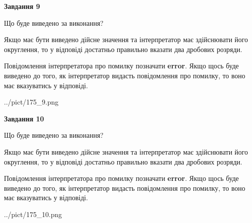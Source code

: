 \documentclass[12pt, ukrainian]{article}
\begin{document}
{\begin {Large}
{\begin {center}\textbf{Завдання 9}\end {center}}\par
Що буде виведено за виконання? \par

Якщо має бути виведено дійсне значення та інтерпретатор має здійснювати його округлення, 
то у відповіді достатньо правильно вказати два дробових розряди.

Повідомлення інтерпретатора про помилку позначати \textbf{error}.
Якщо щось буде виведено до того, як інтерпретатор видасть повідомлення про помилку, 
то воно має вказуватись у відповіді. \par

\begin{center}
	{../pict/175_9.png}
\end{center}
\newpage

{\begin {center}\textbf{Завдання 10}\end {center}}\par
Що буде виведено за виконання? \par

Якщо має бути виведено дійсне значення та інтерпретатор має здійснювати його округлення, 
то у відповіді достатньо правильно вказати два дробових розряди.

Повідомлення інтерпретатора про помилку позначати \textbf{error}.
Якщо щось буде виведено до того, як інтерпретатор видасть повідомлення про помилку, 
то воно має вказуватись у відповіді. \par

\begin{center}
	{../pict/175_10.png}
\end{center}
\newpage

\end {Large}}
\end{document}
